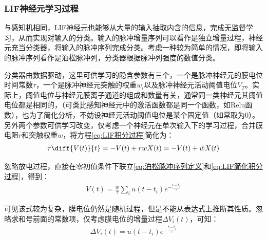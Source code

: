 \documentclass[11pt]{article}
\begin{document}
\subsubsection{LIF神经元学习过程}
与感知机相同，LIF神经元也能够从大量的输入抽取内含的信息，完成无监督学习，从而实现对输入的分类。输入的脉冲增量序列可以看作是独立增量过程，神经元充当分类器，将输入的脉冲序列完成分类。考虑一种较为简单的情况，即将输入的脉冲序列看作是泊松脉冲列\cite{ZhouYinQingSuiJiGuoChengLiLun2013,NIPS2009_a5cdd4aa}，分类器根据脉冲列强度的数值分类。\par
分类器由数据驱动，这里可供学习的隐含参数有三个，一个是脉冲神经元的膜电位时间常数$\tau$，一个是脉冲神经元突触的权重$w_i$以及脉冲神经元活动阈值电位$V_T$。实际上，阈值电位与神经元膜离子通道的组成和数量有关，通常同一类神经元其阈值电位都是相同的，（可类比感知神经元中的激活函数都是同一个函数，如Relu函数），也为了简化分析，不妨设神经元活动阈值电位是某个固定值（如常取为0）。另外两个参数可供学习改变，仅考虑一个神经元在单次输入下的学习过程，合并膜电阻$r$和突触权重$w$，将方程\ref{eq:LIF积分过程}简化为：
\begin{align}
  \tau\diff{V(t)}{t}=-V(t)+rwX(t)=-V(t)+\tilde{w}X(t)
  \label{eq:LIF简化积分过程}
\end{align}\par
忽略放电过程，直接在零初值条件下联立\ref{eq:泊松脉冲序列定义}和\ref{eq:LIF简化积分过程}，得到：
\begin{align}
  V(t)=\frac{\tilde{w}}{\tau}\sum\limits_{i}u(t-t_i)e^{-\frac{t-t_i}{\tau}}
  \label{eq:不考虑放电的膜电位}
\end{align}\par
可见该式较为复杂，膜电位仍然是随机过程，但是不能从表达式上推断其性质。忽略求和号前面的常数项，仅考虑膜电位的增量过程$\Delta V_i(t)$，可知：
\begin{align}
  \Delta V_i(t)=u(t-t_i)e^{-\frac{t-t_i}{\tau}}
\end{align}

\newpage
\printbibliography[heading=bibliography,title=参考文献]
\end{document}
